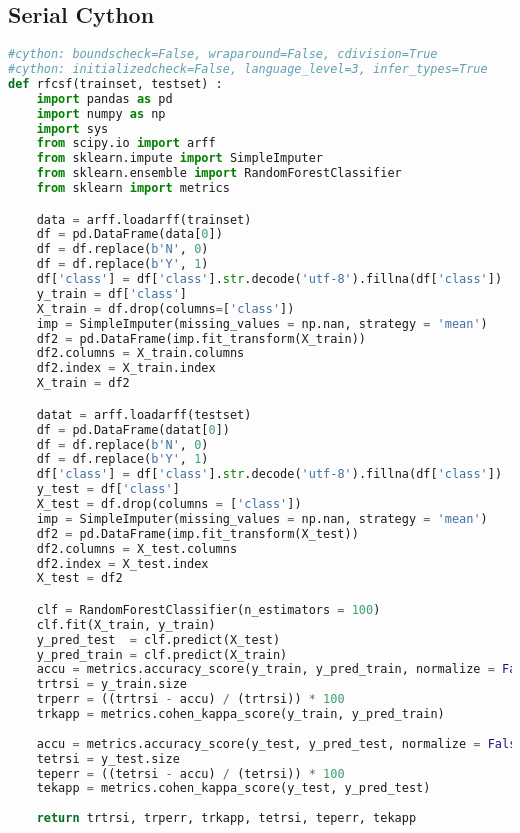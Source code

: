 \subsection{Serial Cython}
\begin{lstlisting}[language=Python, caption={Serial Cython implementation of the RF test case - Cython module code.}]
#cython: boundscheck=False, wraparound=False, cdivision=True
#cython: initializedcheck=False, language_level=3, infer_types=True
def rfcsf(trainset, testset) :
    import pandas as pd
    import numpy as np
    import sys
    from scipy.io import arff
    from sklearn.impute import SimpleImputer
    from sklearn.ensemble import RandomForestClassifier
    from sklearn import metrics

    data = arff.loadarff(trainset)
    df = pd.DataFrame(data[0])
    df = df.replace(b'N', 0)
    df = df.replace(b'Y', 1)
    df['class'] = df['class'].str.decode('utf-8').fillna(df['class'])
    y_train = df['class']
    X_train = df.drop(columns=['class'])
    imp = SimpleImputer(missing_values = np.nan, strategy = 'mean')
    df2 = pd.DataFrame(imp.fit_transform(X_train))
    df2.columns = X_train.columns
    df2.index = X_train.index
    X_train = df2

    datat = arff.loadarff(testset)
    df = pd.DataFrame(datat[0])
    df = df.replace(b'N', 0)
    df = df.replace(b'Y', 1)
    df['class'] = df['class'].str.decode('utf-8').fillna(df['class'])
    y_test = df['class']
    X_test = df.drop(columns = ['class'])
    imp = SimpleImputer(missing_values = np.nan, strategy = 'mean')
    df2 = pd.DataFrame(imp.fit_transform(X_test))
    df2.columns = X_test.columns
    df2.index = X_test.index
    X_test = df2

    clf = RandomForestClassifier(n_estimators = 100)
    clf.fit(X_train, y_train)
    y_pred_test  = clf.predict(X_test)
    y_pred_train = clf.predict(X_train)
    accu = metrics.accuracy_score(y_train, y_pred_train, normalize = False)
    trtrsi = y_train.size
    trperr = ((trtrsi - accu) / (trtrsi)) * 100
    trkapp = metrics.cohen_kappa_score(y_train, y_pred_train)
    
    accu = metrics.accuracy_score(y_test, y_pred_test, normalize = False)
    tetrsi = y_test.size
    teperr = ((tetrsi - accu) / (tetrsi)) * 100
    tekapp = metrics.cohen_kappa_score(y_test, y_pred_test)
    
    return trtrsi, trperr, trkapp, tetrsi, teperr, tekapp
\end{lstlisting}





